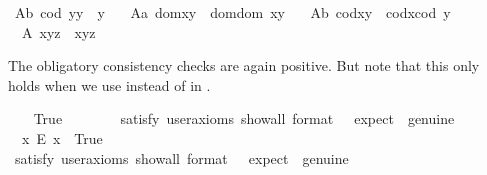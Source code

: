 \begin{isabellebody}
\ A{}b{\isacharcolon}\ {\isachardoublequoteopen}{\isacharparenleft}cod\ y{\isacharparenright}{\isasymcdot}y\ {\isasymcong}\ y{\isachardoublequoteclose}\ \ \isanewline
\ A{}a{\isacharcolon}\ {\isachardoublequoteopen}dom{\isacharparenleft}x{\isasymcdot}y{\isacharparenright}\ {\isasymcong}\ dom{\isacharparenleft}{\isacharparenleft}dom\ x{\isacharparenright}{\isasymcdot}y{\isacharparenright}{\isachardoublequoteclose}\ \ \isanewline
\ A{}b{\isacharcolon}\ {\isachardoublequoteopen}cod{\isacharparenleft}x{\isasymcdot}y{\isacharparenright}\ {\isasymcong}\ cod{\isacharparenleft}x{\isasymcdot}{\isacharparenleft}cod\ y{\isacharparenright}{\isacharparenright}{\isachardoublequoteclose}\ \ \isanewline
\ \ A{}{\isacharcolon}\ {\isachardoublequoteopen}x{\isasymcdot}{\isacharparenleft}y{\isasymcdot}z{\isacharparenright}\ {\isasymcong}\ {\isacharparenleft}x{\isasymcdot}y{\isacharparenright}{\isasymcdot}z{\isachardoublequoteclose}%
\begin{isamarkuptext}%
The obligatory consistency checks are again positive. 
 But note that this only holds when we use \isa{{\isasymsimeq}} instead of  \isa{{\isasymcong}} in  .%
\end{isamarkuptext}\isamarkuptrue%
\ \ \isamarkupfalse%
\ True\ \ %
\isanewline
\ \ \ \ \isamarkupfalse%
\ {\isacharbrackleft}satisfy{\isacharcomma}\ user{\isacharunderscore}axioms{\isacharcomma}\ show{\isacharunderscore}all{\isacharcomma}\ format\ {\isacharequal}\ {}{\isacharcomma}\ expect\ {\isacharequal}\ genuine{\isacharbrackright}%
\isadelimproof
\ %
\endisadelimproof
%
\isatagproof
{}\isamarkupfalse%
%
\endisatagproof
{\isafoldproof}%
%
\isadelimproof
%
\endisadelimproof
\isanewline
\ \ \isamarkupfalse%
\ \ {\isachardoublequoteopen}{\isasymexists}x{\isachardot}\ \isactrlbold {\isasymnot}{\isacharparenleft}E\ x{\isacharparenright}{\isachardoublequoteclose}\ \ True\ \ \ %
\ \ \isanewline
\ \ \ \ \isamarkupfalse%
\ {\isacharbrackleft}satisfy{\isacharcomma}\ user{\isacharunderscore}axioms{\isacharcomma}\ show{\isacharunderscore}all{\isacharcomma}\ format\ {\isacharequal}\ {}{\isacharcomma}\ expect\ {\isacharequal}\ genuine{\isacharbrackright}%
\isadelimproof
\ %
\endisadelimproof
%
\isatagproof
{}\isamarkupfalse%
%
\endisatagproof

\end{isabellebody}
